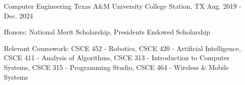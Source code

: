 

\begin{cventries}

  \cventry
    {Computer Engineering}
    {Texas A\&M University} %
    {College Station, TX} %
    {Aug. 2019 - Dec. 2024} %
    {
      \begin{cvitems} %
        \item {Honors: National Merit Scholarship, Presidents Endowed Scholarship}
        \item {Relevant Coursework: CSCE 452 - Robotics, CSCE 420 - Artificial Intelligence, CSCE 411 - Analysis of Algorithms, CSCE 313 - Introduction to Computer Systems, CSCE 315 - Programming Studio, CSCE 464 - Wireless \& Mobile Systems}
      \end{cvitems}
    }

\end{cventries}
